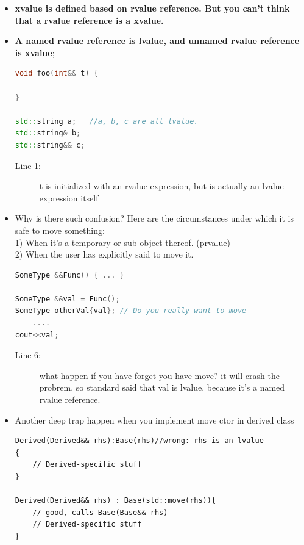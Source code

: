 \documentclass[a4paper,11pt,twoside]{book}
\begin{document}
\begin{itemize}
	\item \textbf{xvalue is defined based on rvalue reference. But you can't think that a rvalue reference is a xvalue. }
	
	\item \textbf{A named rvalue reference is lvalue, and unnamed rvalue reference is xvalue};
	
\begin{lstlisting}[frame=single, language=c++,mathescape=true]
void foo(int&& t) {

}
	
std::string a;   //a, b, c are all lvalue.
std::string& b;
std::string&& c;
\end{lstlisting}
\begin{description}
	\item[Line 1:] t is initialized with an rvalue expression, but is actually an lvalue expression itself
\end{description}
	

	\item Why is there such confusion? Here are the circumstances under which it is safe to move something:\\
	1) When it's a temporary or sub-object thereof. (prvalue) \\
	2) When the user has explicitly said to move it.
\begin{lstlisting}[frame=single, language=c++]
SomeType &&Func() { ... }
	
SomeType &&val = Func();
SomeType otherVal{val}; // Do you really want to move 
	....
cout<<val; 
\end{lstlisting}
\begin{description}
	\item[Line 6:] what happen if you have forget you have move? it will crash the probrem. so standard said that val is lvalue. because it's a named rvalue reference.
\end{description}
	
\item Another deep trap happen when you implement move ctor in derived class
\begin{lstlisting}[numbers=none]
Derived(Derived&& rhs):Base(rhs)//wrong: rhs is an lvalue
{
	// Derived-specific stuff
}
	
Derived(Derived&& rhs) : Base(std::move(rhs)){
	// good, calls Base(Base&& rhs)
	// Derived-specific stuff
}
\end{lstlisting}
	
\end{itemize}
\end{document}
